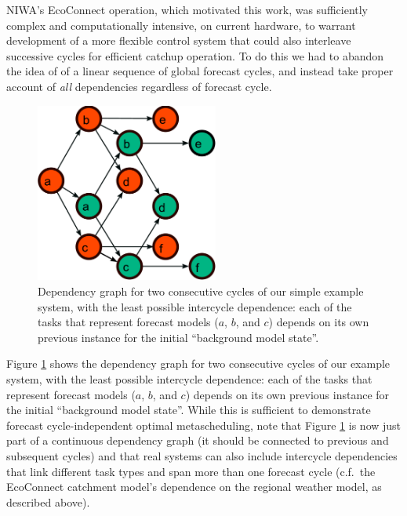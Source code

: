 \documentclass[11pt,a4paper]{article}
\begin{document}
NIWA's EcoConnect operation, which motivated this work, was sufficiently
complex and computationally intensive, on current hardware, to warrant
development of a more flexible control system that could also interleave
successive cycles for efficient catchup operation.  To do this we had
to abandon the idea of of a linear sequence of global forecast cycles,
and instead take proper account of {\em all} dependencies regardless of
forecast cycle. 
\begin{figure} \begin{center}
    \includegraphics[width=6cm]{dependencies-two} \end{center}
    \caption{\small Dependency graph for two consecutive cycles of our
    simple example system, with the least possible intercycle
    dependence: each of the tasks that represent forecast models ($a$,
    $b$, and $c$) depends on its own previous instance for the initial
    ``background model state''.} 
    \label{fig-dep-two}
\end{figure}
Figure \ref{fig-dep-two} shows the dependency graph for two consecutive
cycles of our example system, with the least possible intercycle
dependence: each of the tasks that represent forecast models ($a$, $b$,
and $c$) depends on its own previous instance for the initial
``background model state''. While this is sufficient to demonstrate
forecast cycle-independent optimal metascheduling, note that Figure
\ref{fig-dep-two} is now just part of a continuous dependency graph (it
should be connected to previous and subsequent cycles) and that real
systems can also include intercycle dependencies that link different
task types and span more than one forecast cycle (c.f.\ the EcoConnect
catchment model's dependence on the regional weather model, as described
above). 
\end{document}
